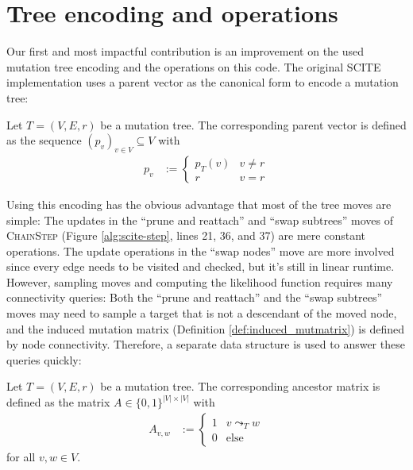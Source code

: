 \section{Tree encoding and operations}

Our first and most impactful contribution is an improvement on the used mutation tree encoding and the operations on this code. The original \ac{SCITE} implementation \cite{tree2016} uses a parent vector as the canonical form to encode a mutation tree:

\begin{definition}
    \label{def:parent_vector}
    Let $T = (V, E, r)$ be a mutation tree. The corresponding parent vector is defined as the sequence $(p_v)_{v \in V} \subseteq V$ with
    \begin{align*}
        p_v &:= \begin{cases}
            p_T(v) & v \neq r \\
            r & v = r 
        \end{cases}
    \end{align*}
\end{definition}

Using this encoding has the obvious advantage that most of the tree moves are simple: The updates in the ``prune and reattach'' and ``swap subtrees'' moves of \textsc{ChainStep} (Figure \ref{alg:scite-step}, lines 21, 36, and 37) are mere constant operations. The update operations in the ``swap nodes'' move are more involved since every edge needs to be visited and checked, but it's still in linear runtime. However, sampling moves and computing the likelihood function requires many connectivity queries: Both the ``prune and reattach'' and the ``swap subtrees'' moves may need to sample a target that is not a descendant of the moved node, and the induced mutation matrix (Definition \ref{def:induced_mutmatrix}) is defined by node connectivity. Therefore, a separate data structure is used to answer these queries quickly:

\begin{definition}
    \label{def:ancestor_matrix}
    Let $T = (V, E, r)$ be a mutation tree. The corresponding ancestor matrix is defined as the matrix $A \in \{0,1\}^{|V| \times |V|}$ with
    \begin{align*}
        A_{v,w} &:= \begin{cases}
            1 & v \leadsto_T w \\
            0 & \text{else}
        \end{cases}
    \end{align*}
    for all $v, w \in V$.
\end{definition}

